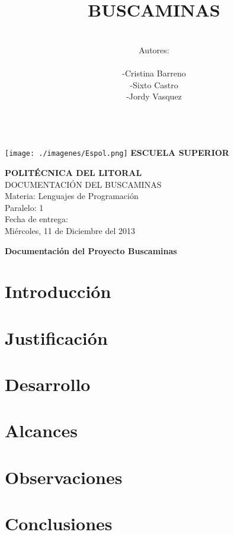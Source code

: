 \documentclass[11pt]{article} %
\title{\fontsize{30}{0} \bf BUSCAMINAS}
\author{\\Autores: \\  \\-Cristina Barreno \\ -Sixto Castro \\ -Jordy Vasquez\\ \\}
\begin{document}
\newpage

 \texttt{[image: ./imagenes/Espol.png]}{ \fontsize{18}{0} \bf ESCUELA SUPERIOR \\}
\begin{center}
{\fontsize{18}{0} \bf POLITÉCNICA DEL LITORAL\\}
\vspace{2cm}
{\LARGE{ DOCUMENTACIÓN DEL BUSCAMINAS }}\\
\vspace{2cm}
{\LARGE{ Materia: Lenguajes de Programación }}\\
\vspace{2cm}
{\LARGE{ Paralelo: 1}}\\
\vspace{2cm}
{\LARGE{Fecha de entrega: \\  Miércoles, 11 de Diciembre del 2013}}
\thispagestyle{empty}
\end{center}


\maketitle

\newpage
\tableofcontents %
\thispagestyle{empty}

\newpage
\begin{center}
 {\fontsize{16}{0} \bf Documentación del Proyecto Buscaminas}
\end{center}

\section{\fontsize{14}{0} \bf Introducción}
\section{\fontsize{14}{0} \bf Justificación}
\section{\fontsize{14}{0} \bf Desarrollo}
\section{\fontsize{14}{0} \bf Alcances}
\section{\fontsize{14}{0} \bf Observaciones}
\section{\fontsize{14}{0} \bf Conclusiones}
\end{document}
